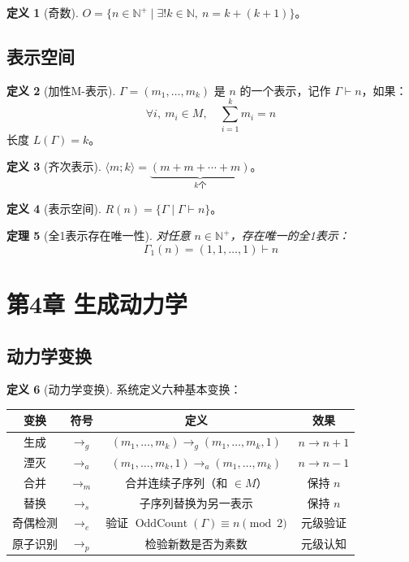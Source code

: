 \documentclass[12pt]{article}
\newtheorem{theorem}{定理}[section]
\theoremstyle{definition}
\newtheorem{definition}[theorem]{定义}
\newcommand{\N}{\mathbb{N}}
\newcommand{\OddCount}{\operatorname{OddCount}}
\begin{document}
\begin{definition}[奇数]
\(O = \{n \in \N^+ \mid \exists! k \in \N,\ n = k + (k+1)\}\)。
\end{definition}

\subsection{表示空间}

\begin{definition}[加性M-表示]
\(\Gamma = (m_1, \dots, m_k)\) 是 \(n\) 的一个表示，记作 \(\Gamma \vdash n\)，如果：
\[
\forall i,\ m_i \in M,\quad \sum_{i=1}^k m_i = n
\]
长度 \(L(\Gamma) = k\)。
\end{definition}

\begin{definition}[齐次表示]
\(\langle m;k \rangle = \underbrace{(m+m+\cdots+m)}_{k\text{个}}\)。
\end{definition}

\begin{definition}[表示空间]
\(R(n) = \{\Gamma \mid \Gamma \vdash n\}\)。
\end{definition}

\begin{theorem}[全1表示存在唯一性]
对任意 \(n \in \N^+\)，存在唯一的全1表示：
\[
\Gamma_1(n) = (1,1,\dots,1) \vdash n
\]
\end{theorem}

\section{第4章 生成动力学}

\subsection{动力学变换}

\begin{definition}[动力学变换]
系统定义六种基本变换：
\begin{center}
\begin{tabular}{|c|c|c|c|}
\hline
\textbf{变换} & \textbf{符号} & \textbf{定义} & \textbf{效果} \\
\hline
生成 & \(\rightarrow_g\) & \((m_1,\dots,m_k) \rightarrow_g (m_1,\dots,m_k,1)\) & \(n \rightarrow n+1\) \\
湮灭 & \(\rightarrow_a\) & \((m_1,\dots,m_k,1) \rightarrow_a (m_1,\dots,m_k)\) & \(n \rightarrow n-1\) \\
合并 & \(\rightarrow_m\) & 合并连续子序列（和 \(\in M\)） & 保持 \(n\) \\
替换 & \(\rightarrow_s\) & 子序列替换为另一表示 & 保持 \(n\) \\
奇偶检测 & \(\rightarrow_e\) & 验证 \(\OddCount(\Gamma) \equiv n \pmod{2}\) & 元级验证 \\
原子识别 & \(\rightarrow_p\) & 检验新数是否为素数 & 元级认知 \\
\hline
\end{tabular}
\end{center}
\end{definition}
\end{document}
